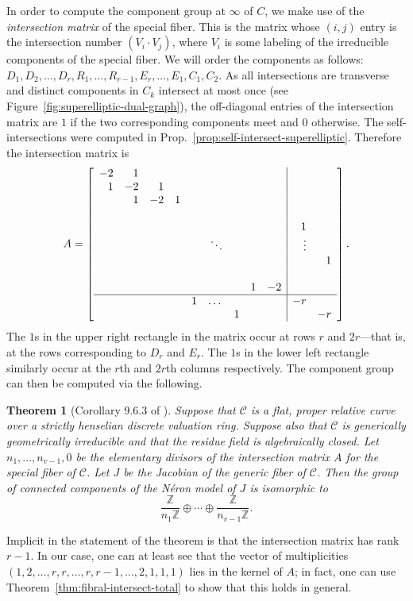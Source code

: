 \documentclass[pagesize,paper=letter]{scrartcl}
\newcommand{\scd}{\mathscr{C}}
\theoremstyle{plain}
\newtheorem{theorem}{Theorem}[section]
\theoremstyle{definition}
\theoremstyle{remark}
\newcommand{\Z}{\ensuremath{\mathbb{Z}}}
\begin{document}
In order to compute the component group at $\infty$ of $C$, we make use of the \emph{intersection matrix} of the special fiber. This is the matrix whose $(i,j)$ entry is the intersection number $(V_i \cdot V_j)$, where $V_i$ is some labeling of the irreducible components of the special fiber. We will order the components as follows: $D_1, D_2, \dots, D_r, R_1, \dots, R_{r-1}, E_r, \dots, E_1, C_1, C_2$. As all intersections are transverse and distinct components in $C_k$ intersect at most once (see Figure~\ref{fig:superelliptic-dual-graph}), the off-diagonal entries of the intersection matrix are $1$ if the two corresponding components meet and $0$ otherwise. The self-intersections were computed in Prop.~\ref{prop:self-intersect-superelliptic}. Therefore the intersection matrix is
\[
A = \left[\begin{array}{rrrrrrrrr|rr}
  -2 & 1 & & & & & & & & & \\
  1 & -2 & 1 & & & & & & & & \\
  & 1 & -2 & 1 & & & & & & & \\
  & & & & & & & & & & \\
  & & & & & & & & & 1 & \\
  & & & & & \ddots & & & & \vdots & \\
  & & & & & & & & & & 1 \\
  & & & & & & & & & & \\
  & & & & & & & 1 & -2 & & \\ \hline
  & & & & 1 & \dots & & & & -r & \\
  & & & & & & 1 & & & & -r
\end{array}\right].
\]
The $1$s in the upper right rectangle in the matrix occur at rows $r$ and $2r$---that is, at the rows corresponding to $D_r$ and $E_r$. The $1$s in the lower left rectangle similarly occur at the $r$th and $2r$th columns respectively. The component group can then be computed via the following.
\begin{theorem}[Corollary 9.6.3 of \cite{blr}]\label{thm:elementary-divisors-comp-group}
  Suppose that $\scd$ is a flat, proper relative curve over a strictly henselian discrete valuation ring. Suppose also that $\scd$ is generically geometrically irreducible and that the residue field is algebraically closed. Let $n_1, \dots, n_{v-1}, 0$ be the elementary divisors of the intersection matrix $A$ for the special fiber of $\scd$. Let $J$ be the Jacobian of the generic fiber of $\scd$. Then the group of connected components of the N\'eron model of $J$ is isomorphic to
  \[
  \frac{\Z}{n_1\Z} \oplus \cdots \oplus \frac{\Z}{n_{v-1}\Z}.
  \]
\end{theorem}
Implicit in the statement of the theorem is that the intersection matrix has rank $r-1$. In our case, one can at least see that the vector of multiplicities $(1,2,\dots,r,r,\dots,r,r-1,\dots,2,1,1,1)$ lies in the kernel of $A$; in fact, one can use Theorem~\ref{thm:fibral-intersect-total} to show that this holds in general.
\end{document}
